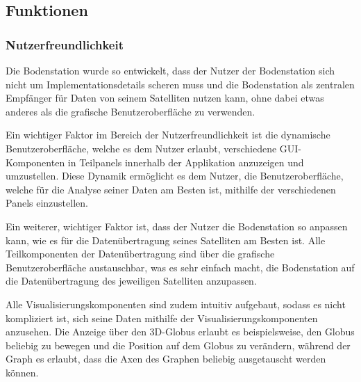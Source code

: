 \subsection{Funktionen}
\subsubsection{Nutzerfreundlichkeit}
Die Bodenstation wurde so entwickelt, dass der Nutzer der Bodenstation sich nicht um Implementationsdetails scheren muss und die Bodenstation als zentralen Empfänger für Daten von seinem Satelliten nutzen kann, ohne dabei etwas anderes als die grafische Benutzeroberfläche zu verwenden. 

Ein wichtiger Faktor im Bereich der Nutzerfreundlichkeit ist die dynamische Benutzeroberfläche, welche es dem Nutzer erlaubt, verschiedene GUI-Komponenten in Teilpanels innerhalb der Applikation anzuzeigen und umzustellen. Diese Dynamik ermöglicht es dem Nutzer, die Benutzeroberfläche, welche für die Analyse seiner Daten am Besten ist, mithilfe der verschiedenen Panels einzustellen.

Ein weiterer, wichtiger Faktor ist, dass der Nutzer die Bodenstation so anpassen kann, wie es für die Datenübertragung seines Satelliten am Besten ist. Alle Teilkomponenten der Datenübertragung sind über die grafische Benutzeroberfläche austauschbar, was es sehr einfach macht, die Bodenstation auf die Datenübertragung des jeweiligen Satelliten anzupassen.

Alle Visualisierungskomponenten sind zudem intuitiv aufgebaut, sodass es nicht kompliziert ist, sich seine Daten mithilfe der Visualisierungskomponenten anzusehen. Die Anzeige über den 3D-Globus erlaubt es beispielsweise, den Globus beliebig zu bewegen und die Position auf dem Globus zu verändern, während der Graph es erlaubt, dass die Axen des Graphen beliebig ausgetauscht werden können.

